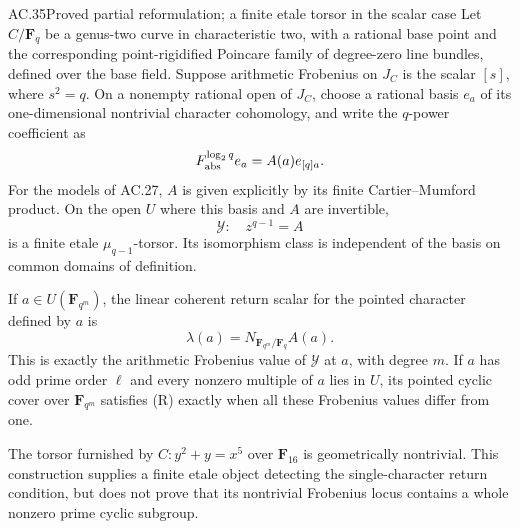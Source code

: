 \begin{claim}{AC.35}{Proved partial reformulation; a finite etale torsor in the scalar case}
Let \(C/\mathbf F_q\) be a genus-two curve in characteristic
two, with a rational base point and the corresponding point-rigidified
Poincare family of degree-zero line bundles, defined over the base field. Suppose arithmetic Frobenius
on \(J_C\) is the scalar \([s]\), where \(s^2=q\).
On a nonempty rational open of \(J_C\), choose a rational basis
\(e_a\) of its one-dimensional nontrivial character cohomology,
and write the \(q\)-power coefficient as
\[
                     F_{\rm abs}^{\log_2q}e_a
                              =A(a)e_{[q]a}.
\]
For the models of AC.27, \(A\) is given explicitly by its
finite Cartier--Mumford product.
On the open \(U\) where this basis and \(A\) are invertible,
\[
                         \mathcal Y:\quad z^{q-1}=A
\]
is a finite etale \(\mu_{q-1}\)-torsor.
Its isomorphism class is independent of the basis on common
domains of definition.

If \(a\in U(\mathbf F_{q^m})\), the linear coherent return
scalar for the pointed character defined by \(a\) is
\[
                    \lambda(a)=
                    N_{\mathbf F_{q^m}/\mathbf F_q} A(a).
\]
This is exactly the arithmetic Frobenius value of
\(\mathcal Y\) at \(a\), with degree \(m\).
If \(a\) has odd prime order \(\ell\) and every nonzero multiple
of \(a\) lies in \(U\), its pointed cyclic cover over
\(\mathbf F_{q^m}\) satisfies (R) exactly when all these
Frobenius values differ from one.

The torsor furnished by \(C:y^2+y=x^5\) over \(\mathbf F_{16}\)
is geometrically nontrivial. This construction supplies a
finite etale object detecting the single-character return
condition, but does not prove that its nontrivial Frobenius
locus contains a whole nonzero prime cyclic subgroup.
\end{claim}
